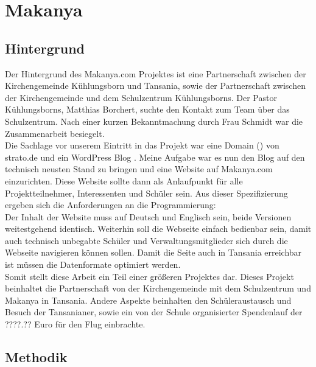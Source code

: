 \section{Makanya}

\subsection{Hintergrund} %
Der Hintergrund des Makanya.com Projektes ist eine Partnerschaft zwischen der Kirchengemeinde Kühlungsborn und Tansania,
sowie der Partnerschaft zwischen der Kirchengemeinde und dem Schulzentrum Kühlungsborns.
Der Pastor Kühlungsborns, Matthias Borchert,
suchte den Kontakt zum \jf Team über das Schulzentrum.
Nach einer kurzen Bekanntmachung durch Frau Schmidt war die Zusammenarbeit besiegelt.\\
Die Sachlage vor unserem Eintritt in das Projekt war eine Domain () von strato.de %
und ein WordPress Blog . %
Meine Aufgabe war es nun den Blog auf den technisch neusten Stand zu bringen und eine Website auf Makanya.com einzurichten.
Diese Website sollte dann als Anlaufpunkt für alle Projektteilnehmer, Interessenten und Schüler sein.
Aus dieser Spezifizierung ergeben sich die Anforderungen an die Programmierung:\\
Der Inhalt der Website muss auf Deutsch und Englisch sein, beide Versionen weitestgehend identisch.
Weiterhin soll die Webseite einfach bedienbar sein,
damit auch technisch unbegabte Schüler und Verwaltungsmitglieder sich durch die Webseite navigieren können sollen.
Damit die Seite auch in Tansania erreichbar ist müssen die Datenformate optimiert werden.\\
Somit stellt diese Arbeit ein Teil einer größeren Projektes dar.
Dieses Projekt beinhaltet die Partnerschaft von der Kirchengemeinde mit dem Schulzentrum und Makanya in Tansania.
Andere Aspekte beinhalten den Schüleraustausch und Besuch der Tansanianer,
sowie ein von der Schule organisierter Spendenlauf der ????.?? Euro für den Flug einbrachte. %

\subsection{Methodik} %

